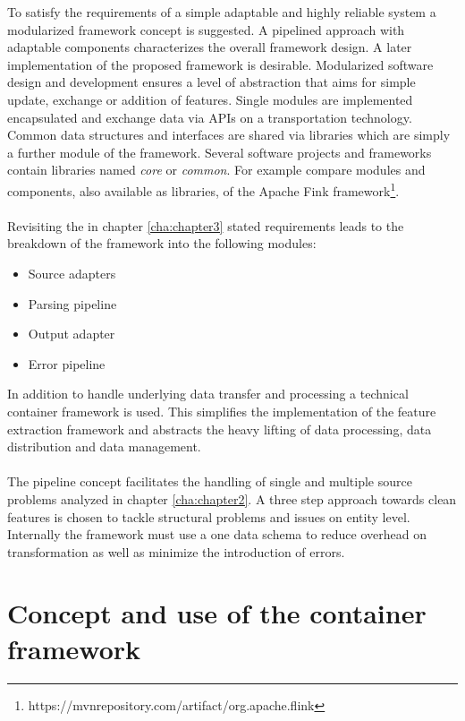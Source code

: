 To satisfy the requirements of a simple adaptable and highly reliable system a modularized framework concept is suggested. A pipelined approach with adaptable components characterizes the overall framework design. A later implementation of the proposed framework is desirable. Modularized software design and development ensures a level of abstraction that aims for simple update, exchange or addition of features. Single modules are implemented encapsulated and exchange data via APIs on a transportation technology. Common data structures and interfaces are shared via libraries which are simply a further module of the framework. Several software projects and frameworks contain libraries named \textit{core} or \textit{common}. For example compare modules and components, also available as libraries, of the Apache Fink framework\footnote{https://mvnrepository.com/artifact/org.apache.flink}.
\\\\
Revisiting the in chapter \ref{cha:chapter3} stated requirements leads to the breakdown of the framework into the following modules:
\begin{itemize}
\item Source adapters
\item Parsing pipeline
\item Output adapter
\item Error pipeline
\end{itemize}
In addition to handle underlying data transfer and processing a technical container framework is used. This simplifies the implementation of the feature extraction framework and abstracts the heavy lifting of data processing, data distribution and data management.
\\\\
The pipeline concept facilitates the handling of single and multiple source problems analyzed in chapter \ref{cha:chapter2}. A three step approach towards clean features is chosen to tackle structural problems and issues on entity level. Internally the framework must use a one data schema to reduce overhead on transformation as well as minimize the introduction of errors.

\section{Concept and use of the container framework \label{sec:containerframework}}

